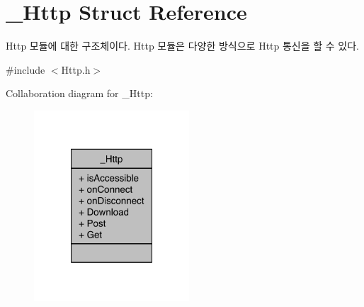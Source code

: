 \hypertarget{struct__Http}{\section{\-\_\-\-Http Struct Reference}
\label{struct__Http}
}


Http 모듈에 대한 구조체이다. Http 모듈은 다양한 방식으로 Http 통신을 할 수 있다.  




{\ttfamily \#include $<$Http.\-h$>$}



Collaboration diagram for \-\_\-\-Http\-:\nopagebreak
\begin{figure}[H]
\begin{center}
\leavevmode
\includegraphics[width=164pt]{d8/d80/struct__Http__coll__graph}
\end{center}
\end{figure}
